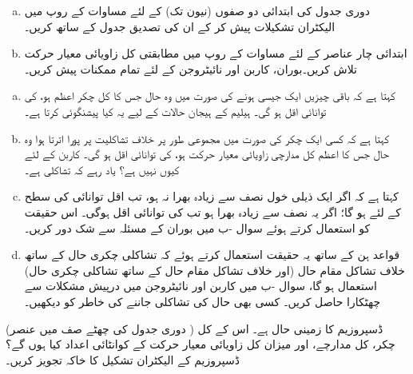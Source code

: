 \begin{enumerate}[a.]
\item
 دوری جدول کی ابتدائی دو صفوں (نیون تک) کے لئے مساوات  کے روپ میں الیکٹران تشکیلات پیش کر کے ان کی تصدیق جدول  کے ساتھ کریں۔ 
 \item
 ابتدائی چار عناصر کے لئے مساوات  کے روپ میں مطابقتی کل زاویائی معیار حرکت تلاش کریں۔بوران، کاربن اور نائیٹروجن کے لئے تمام ممکنات پیش کریں۔
 \end{enumerate}
\begin{enumerate}[a.]
\item
{} کہتا ہے کہ باقی چیزیں ایک جیسی ہونے کی صورت میں وہ حال جس کا کل چکر  اعظم ہو، کی توانائی اقل ہو گی۔ ہیلیم کے ہیجان حالات کے لیے یہ کیا پیشنگوئی کرتا ہے۔
 \item
{} کہتا ہے کہ کسی ایک چکر کی صورت میں مجموعی طور پر خلاف تشاکلیت پر پورا اترتا ہوا وہ حال جس کا اعظم کل مدارچی زاویائی معیار حرکت  ہو، کی توانائی اقل ہو گی۔ کاربن کے لئے  کیوں نہیں ہے؟ یاد رہے کہ   تشاکلی ہے۔
\item
{} کہتا ہے کہ اگر ایک ذیلی خول  نصف سے زیادہ بھرا نہ ہو، تب اقل توانائی کی سطح کے لئے  ہو گا؛ اگر یہ نصف سے زیادہ بھرا ہو تب  کی توانائی اقل ہوگی۔ اس حقیقت کو استعمال کرتے ہوئے سوال -ب میں بوران کے مسئلہ سے شک دور کریں۔
\item
 قواعد ہن کے ساتھ یہ حقیقت استعمال کرتے ہوئے کہ تشاکلی چکری حال کے ساتھ خلاف تشاکل مقام حال (اور خلاف تشاکل مقام حال کے ساتھ تشاکلی چکری حال) استعمال ہو گا، سوال -ب میں کاربن اور نائیٹروجن میں درپیش مشکلات سے چھٹکارا حاصل کریں۔ کسی بھی حال کی تشاکلی جاننے کی خاطر  کو دیکھیں۔
\end{enumerate}
 (دوری جدول کی چھٹے صف میں عنصر ) ڈسپروزیم کا زمینی حال  ہے۔ اس کے کل چکر، کل مدارچے، اور میزان کل زاویائی معیار حرکت کے کوانٹائی اعداد کیا ہوں گے؟ ڈسپروزیم کے الیکٹران تشکیل کا خاکہ تجویز کریں۔
 
